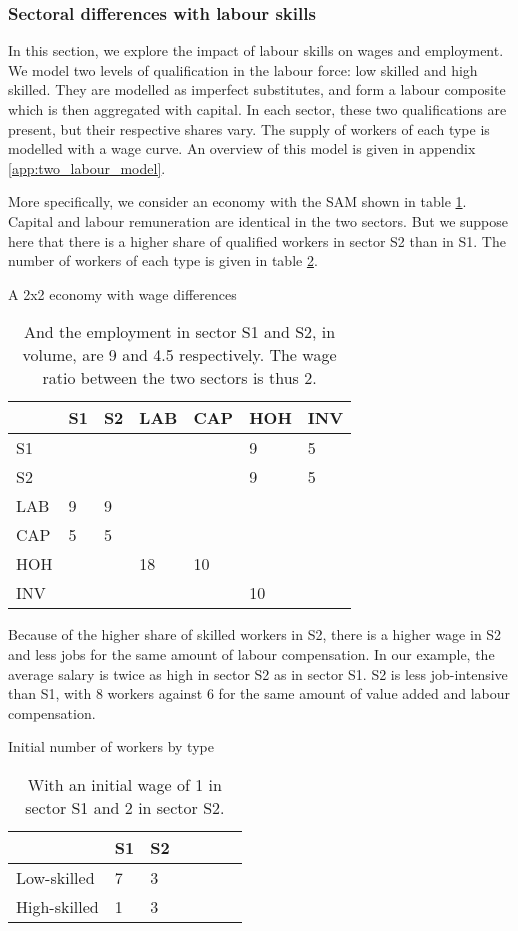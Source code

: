 \subsubsection{Sectoral differences with labour skills} \label{subsubsec:labourSkills}
In this section, we explore the impact of labour skills on wages and employment. We model two levels of qualification in the labour force: low skilled and high skilled. 
They are modelled as imperfect substitutes, and form a labour composite which is then aggregated with capital.
In each sector, these two qualifications are present, but their respective shares vary. 
The supply of workers of each type is modelled with a wage curve.
An overview of this model is given in appendix \ref{app:two_labour_model}.

More specifically, we consider an economy with the SAM shown in table \ref{tab:SAM_twolabours}.
Capital and labour remuneration are identical in the two sectors. 
But we suppose here that there is a higher share of qualified workers in sector S2 than in S1. The number of workers of each type is given in table \ref{tab:labour_type}. 

\begin{table}
	\centering
	\caption{A 2x2 economy with wage differences}
	\label{tab:SAM_twolabours}
	\begin{tabular}{lllllll}
		\toprule
		& S1 & S2 & LAB & CAP & HOH & INV \\
		\midrule
		S1 &  &  &  &  & 9 & 5 \\
		S2 &  &  &  &  & 9 & 5 \\
		LAB & 9 & 9 &  &  &  &  \\
		CAP & 5 & 5 &  &  &  &  \\
		HOH &  &  & 18 & 10 &  &  \\
		INV &  &  &  &  & 10 &  \\
		\bottomrule
	\end{tabular}
	\caption*{And the employment in sector S1 and S2, in volume, are 9 and 4.5 respectively. The wage ratio between the two sectors is thus 2.}
\end{table}

Because of the higher share of skilled workers in S2, there is a higher wage in S2 and less jobs for the same amount of labour compensation.
In our example, the average salary is twice as high in sector S2 as in sector S1. S2 is less job-intensive than S1, with 8 workers against 6 for the same amount of value added and labour compensation.

\begin{table}
	\centering
	\caption{Initial number of workers by type}
	\label{tab:labour_type}
	\begin{tabular}{lllllll}
		\toprule
		& S1 & S2 \\
		\midrule
		Low-skilled & 7 & 3 \\
		High-skilled & 1 & 3 \\
		\bottomrule
	\end{tabular}
	\caption*{With an initial wage of 1 in sector S1 and 2 in sector S2.}
\end{table}

